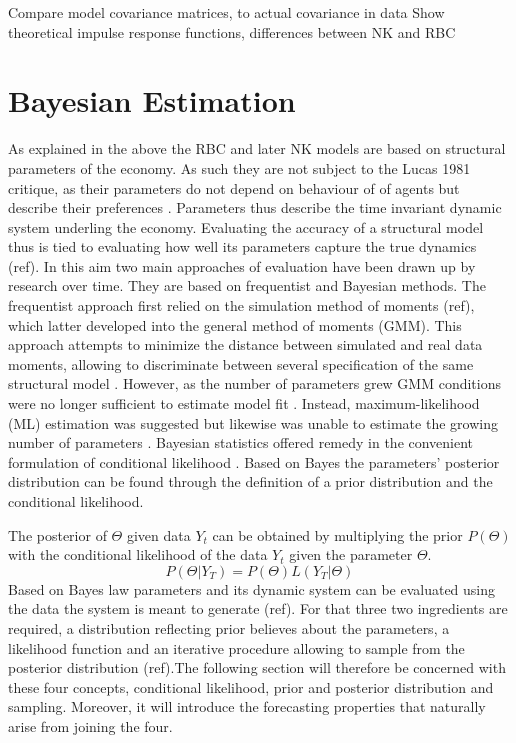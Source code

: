 \documentclass[12pt,a4paper,english]{article} %
\let\oldsection\section
\renewcommand\section{\clearpage\oldsection}
\begin{document}
	Compare model covariance matrices, to actual covariance in data
	Show theoretical impulse response functions, differences between NK and RBC
			
	\section{Bayesian Estimation}
	As explained in the above the RBC and later NK models are based on structural parameters of the economy. As such they are not subject to the Lucas 1981 critique, as their parameters do not depend on behaviour of of agents but describe their preferences \cite{lucas_jr_tobin_1981}. Parameters thus describe the time invariant dynamic system underling the economy. Evaluating the accuracy of a structural model thus is tied to evaluating how well its parameters capture the true dynamics (ref). In this aim two main approaches of evaluation have been drawn up by research over time. They are based on frequentist and Bayesian methods. 
	The frequentist approach first relied on the simulation method of moments (ref), which latter developed into the general method of moments (GMM). This approach attempts to minimize the distance between simulated and real data moments, allowing to discriminate between several specification of the same structural model \cite{christiano_current_1992}. However, as the number of parameters grew GMM conditions were no longer sufficient to estimate model fit \cite{guerron-quintana_bayesian_2013}. Instead, maximum-likelihood (ML) estimation was suggested but likewise was unable to estimate the growing number of parameters \cite{guerron-quintana_bayesian_2013}. Bayesian statistics offered remedy in the convenient formulation of conditional likelihood \cite{guerron-quintana_bayesian_2013}. Based on Bayes the parameters' posterior distribution can be found through the definition of a prior distribution and the conditional likelihood.
	
	The posterior of $\Theta$ given data $Y_t$ can be obtained by multiplying the prior $P(\Theta)$ with the conditional likelihood of the data $Y_t$ given the parameter $\Theta$. 
	\begin{equation} \label{eq:blaw}
		P( \Theta | Y_{T}) = P(\Theta) L(Y_{T} | \Theta)
	\end{equation}
	Based on Bayes law parameters and its dynamic system can be evaluated using the data the system is meant to generate (ref). For that three two ingredients are required, a distribution reflecting prior believes about the parameters, a likelihood function and an iterative procedure allowing to sample from the posterior distribution (ref).The following section will therefore be concerned with these four concepts, conditional likelihood, prior and posterior distribution and sampling. Moreover, it will introduce the forecasting properties that naturally arise from joining the four. 
\end{document}
